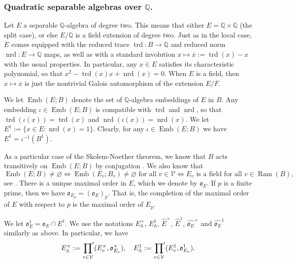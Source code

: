 \documentclass{article}
\theoremstyle{named}
\newcommand{\A}{\mathbb{A}}
\newcommand{\Q}{\mathbb{Q}}
\renewcommand{\o}{\mathfrak{o}}
\newcommand{\Pl}{\mathcal{V}}
\DeclareMathOperator{\Ram}{Ram}
\DeclareMathOperator{\Emb}{Emb}
\DeclareMathOperator{\nrd}{nrd}
\DeclareMathOperator{\trd}{trd}
\begin{document}
\subsubsection{Quadratic separable algebras over $\Q$.}
Let $E$ a separable $\Q$-algebra of degree two. This means that either $E = \Q \times \Q$ (the split case), or else $E/\Q$ is a field extension of degree two. Just as in the local case, $E$ comes equipped with the reduced trace $\trd: B \rightarrow \Q$ and reduced norm $\nrd: E\rightarrow \Q$ maps, as well as with a standard involution $x \mapsto \overline{x}:= \trd(x) - x$ with the usual properties. In particular, any $x \in E$ satisfies its characteristic polynomial, so that $x^2 - \trd(x)x + \nrd(x) = 0$. When $E$ is a field, then $x \mapsto \overline{x}$ is just the nontrivial Galois automorphism of the extension $E/F$. 

We let $\Emb(E; B)$ denote the set of $\Q$-algebra embeddings of $E$ in $B$. Any embedding $\iota \in \Emb(E; B)$ is compatible with $\trd$ and $\nrd$, so that $\trd(\iota(x)) = \trd(x)$ and $\nrd(\iota(x)) = \nrd(x)$. We let $E^1 := \{x \in E: \nrd(x) = 1\}$. Clearly, for any $\iota \in \Emb(E; B)$ we have $E^1 = \iota^{-1}(B^1)$. 

As a particular case of the Skolem-Noether theorem, we know that $B$ acts transitively on $\Emb(E; B)$ by conjugation \cite[Main Theorem 7.7.1]{voight}. We also know that
\begin{equation}
    \Emb(E; B) \neq \varnothing \iff \Emb(E_v; B_v) \neq \varnothing \text{ for all } v \in \Pl \iff E_v \text{ is a field for all } v \in \Ram(B),
\end{equation}
see \cite[Proposition 14.6.7]{voight}. There is a unique maximal order in $E$, which we denote by $\o_E$. If $p$ is a finite prime, then we have $\o_{E_p} = (\o_E)_p$. That is, the completion of the maximal order of $E$ with respect to $p$ is the maximal order of $E_p$. 

We let $\o_E^1 = \o_E \cap E^1$. We use the notations $E_\A^\times$, $E_\A^1$, $\widehat{E}^\times$, $\widehat{E}^1$, $\widehat{\o_E}^\times$ and $\widehat{\o_E}^1$ similarly as above. In particular, we have
\begin{equation*}
    E_\A^\times := \sideset{}{'}\prod_{v \in \Pl}(E_v^\times, \o_{E_v}^\times), \quad E_\A^1 := \sideset{}{'}\prod_{v \in \Pl}(E_v^1, \o_{E_v}^1).
\end{equation*}
\end{document}
